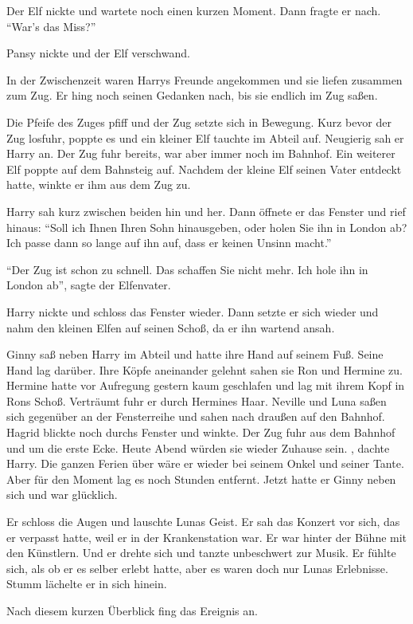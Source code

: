 Der Elf nickte und wartete noch einen kurzen Moment. Dann fragte er nach. \enquote{War’s das Miss?}

Pansy nickte und der Elf verschwand.

In der Zwischenzeit waren Harrys Freunde angekommen und sie liefen zusammen zum Zug. Er hing noch seinen Gedanken nach, bis sie endlich im Zug saßen.

Die Pfeife des Zuges pfiff und der Zug setzte sich in Bewegung. Kurz bevor der Zug losfuhr, poppte es und ein kleiner Elf tauchte im Abteil auf. Neugierig sah er Harry an. Der Zug fuhr bereits, war aber immer noch im Bahnhof. Ein weiterer Elf poppte auf dem Bahnsteig auf. Nachdem der kleine Elf seinen Vater entdeckt hatte, winkte er ihm aus dem Zug zu.

Harry sah kurz zwischen beiden hin und her. Dann öffnete er das Fenster und rief hinaus: \enquote{Soll ich Ihnen Ihren Sohn hinausgeben, oder holen Sie ihn in London ab? Ich passe dann so lange auf ihn auf, dass er keinen Unsinn macht.}

\enquote{Der Zug ist schon zu schnell. Das schaffen Sie nicht mehr. Ich hole ihn in London ab}, sagte der Elfenvater.

Harry nickte und schloss das Fenster wieder. Dann setzte er sich wieder und nahm den kleinen Elfen auf seinen Schoß, da er ihn wartend ansah.

Ginny saß neben Harry im Abteil und hatte ihre Hand auf seinem Fuß. Seine Hand lag darüber. Ihre Köpfe aneinander gelehnt sahen sie Ron und Hermine zu. Hermine hatte vor Aufregung gestern kaum geschlafen und lag mit ihrem Kopf in Rons Schoß. Verträumt fuhr er durch Hermines Haar. Neville und Luna saßen sich gegenüber an der Fensterreihe und sahen nach draußen auf den Bahnhof. Hagrid blickte noch durchs Fenster und winkte. Der Zug fuhr aus dem Bahnhof und um die erste Ecke. Heute Abend würden sie wieder Zuhause sein. , dachte Harry. Die ganzen Ferien über wäre er wieder bei seinem Onkel und seiner Tante. Aber für den Moment lag es noch Stunden entfernt. Jetzt hatte er Ginny neben sich und war glücklich.

Er schloss die Augen und lauschte Lunas Geist. Er sah das Konzert vor sich, das er verpasst hatte, weil er in der Krankenstation war. Er war hinter der Bühne mit den Künstlern. Und er drehte sich und tanzte unbeschwert zur Musik. Er fühlte sich, als ob er es selber erlebt hatte, aber es waren doch nur Lunas Erlebnisse. Stumm lächelte er in sich hinein.

Nach diesem kurzen Überblick fing das Ereignis an.

